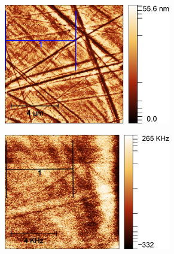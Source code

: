 \begin{figure}[H]
    \centering
    \begin{subfigure}[b]{0.45\textwidth}
        \centering
        \includegraphics[width = 0.8\textwidth]{figures/chap4/cdte-ag/afm-nsom-results/10um/CdTe_Ag_10um_afm.jpg}
    \end{subfigure}\hfill
    \begin{subfigure}[b]{0.45\textwidth}
        \centering
        \includegraphics[width = 0.8\textwidth]{figures/chap4/cdte-ag/afm-nsom-results/10um/CdTe_Ag_10um_nsom.jpg}
    \end{subfigure}


\end{figure}
